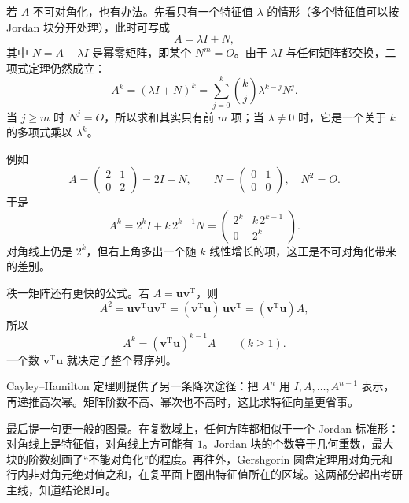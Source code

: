 若 \(A\) 不可对角化，也有办法。先看只有一个特征值 \(\lambda\) 的情形（多个特征值可以按 Jordan 块分开处理），此时可写成
\[
A=\lambda I+N,
\]
其中 \(N=A-\lambda I\) 是幂零矩阵，即某个 \(N^m=O\)。由于 \(\lambda I\) 与任何矩阵都交换，二项式定理仍然成立：
\[
A^k=(\lambda I+N)^k
=\sum_{j=0}^{k}\binom{k}{j}\lambda^{k-j}N^j.
\]
当 \(j\ge m\) 时 \(N^j=O\)，所以求和其实只有前 \(m\) 项；当 \(\lambda\neq0\) 时，它是一个关于 \(k\) 的多项式乘以 \(\lambda^k\)。

例如
\[
A=\begin{pmatrix}2&1\\0&2\end{pmatrix}=2I+N,\qquad
N=\begin{pmatrix}0&1\\0&0\end{pmatrix},\quad N^2=O.
\]
于是
\[
A^k=2^kI+k\,2^{k-1}N
=\begin{pmatrix}2^k&k\,2^{k-1}\\0&2^k\end{pmatrix}.
\]
对角线上仍是 \(2^k\)，但右上角多出一个随 \(k\) 线性增长的项，这正是不可对角化带来的差别。

秩一矩阵还有更快的公式。若 \(A=\mathbf{u}\mathbf{v}^{\mathrm{T}}\)，则
\[
A^2=\mathbf{u}\mathbf{v}^{\mathrm{T}}\mathbf{u}\mathbf{v}^{\mathrm{T}}
=(\mathbf{v}^{\mathrm{T}}\mathbf{u})\,\mathbf{u}\mathbf{v}^{\mathrm{T}}
=(\mathbf{v}^{\mathrm{T}}\mathbf{u})A,
\]
所以
\[
A^k=(\mathbf{v}^{\mathrm{T}}\mathbf{u})^{k-1}A\qquad(k\ge1).
\]
一个数 \(\mathbf{v}^{\mathrm{T}}\mathbf{u}\) 就决定了整个幂序列。

Cayley--Hamilton 定理则提供了另一条降次途径：把 \(A^n\) 用 \(I,A,\dots,A^{n-1}\) 表示，再递推高次幂。矩阵阶数不高、幂次也不高时，这比求特征向量更省事。

最后提一句更一般的图景。在复数域上，任何方阵都相似于一个 Jordan 标准形：对角线上是特征值，对角线上方可能有 \(1\)。Jordan 块的个数等于几何重数，最大块的阶数刻画了“不能对角化”的程度。再往外，Gershgorin 圆盘定理用对角元和行内非对角元绝对值之和，在复平面上圈出特征值所在的区域。这两部分超出考研主线，知道结论即可。

\newpage

